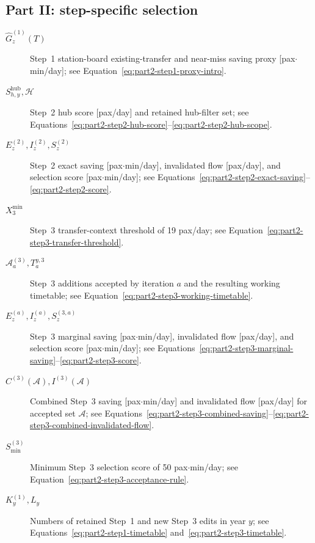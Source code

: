 \documentclass[preprint,12pt]{elsarticle}
\begin{document}
\subsection*{Part II: step-specific selection}
\begin{description}
    \item[$\widehat G_z^{(1)}(T)$] Step~1 station-board existing-transfer and near-miss saving proxy [pax\(\cdot\)min/day]; see Equation~\eqref{eq:part2-step1-proxy-intro}.
    \item[$S^{\mathrm{hub}}_{h,y},\mathcal{H}$] Step~2 hub score [pax/day] and retained hub-filter set; see Equations~\eqref{eq:part2-step2-hub-score}--\eqref{eq:part2-step2-hub-scope}.
    \item[$E_z^{(2)},I_z^{(2)},S_z^{(2)}$] Step~2 exact saving [pax\(\cdot\)min/day], invalidated flow [pax/day], and selection score [pax\(\cdot\)min/day]; see Equations~\eqref{eq:part2-step2-exact-saving}--\eqref{eq:part2-step2-score}.
    \item[$X_3^{\min}$] Step~3 transfer-context threshold of 19 pax/day; see Equation~\eqref{eq:part2-step3-transfer-threshold}.
    \item[$\mathcal{A}_a^{(3)},T_a^{y,3}$] Step~3 additions accepted by iteration \(a\) and the resulting working timetable; see Equation~\eqref{eq:part2-step3-working-timetable}.
    \item[$E_z^{(a)},I_z^{(a)},S_z^{(3,a)}$] Step~3 marginal saving [pax\(\cdot\)min/day], invalidated flow [pax/day], and selection score [pax\(\cdot\)min/day]; see Equations~\eqref{eq:part2-step3-marginal-saving}--\eqref{eq:part2-step3-score}.
    \item[$C^{(3)}(\mathcal{A}),I^{(3)}(\mathcal{A})$] Combined Step~3 saving [pax\(\cdot\)min/day] and invalidated flow [pax/day] for accepted set \(\mathcal{A}\); see Equations~\eqref{eq:part2-step3-combined-saving}--\eqref{eq:part2-step3-combined-invalidated-flow}.
    \item[$S_{\min}^{(3)}$] Minimum Step~3 selection score of 50 pax\(\cdot\)min/day; see Equation~\eqref{eq:part2-step3-acceptance-rule}.
    \item[$K_y^{(1)},L_y$] Numbers of retained Step~1 and new Step~3 edits in year \(y\); see Equations~\eqref{eq:part2-step1-timetable} and~\eqref{eq:part2-step3-timetable}.
\end{description}
\end{document}
